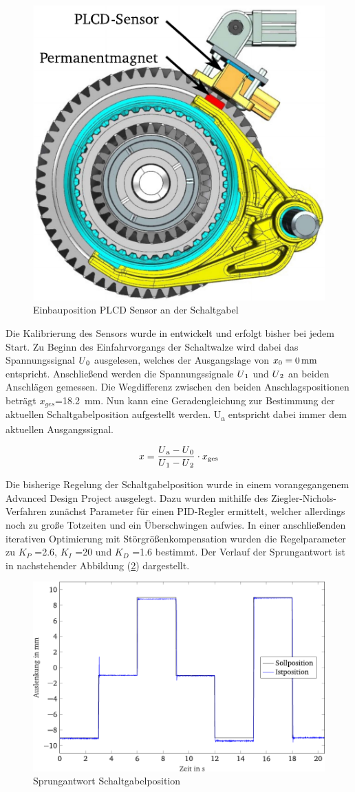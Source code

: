 \begin{figure}[h]
	\centering
		\includegraphics[width=0.35\columnwidth]{Bilder/Sensor.pdf}
	\caption{Einbauposition PLCD Sensor an der Schaltgabel \cite[S.14]{adp}}
	\label{fig:Sensor}
\end{figure} \noindent
Die Kalibrierung des Sensors wurde in \cite[S.24f]{messtechnik} entwickelt und erfolgt bisher bei jedem Start. Zu Beginn des Einfahrvorgangs der Schaltwalze wird dabei das Spannungssignal $U\textsubscript{0}$ ausgelesen, welches der Ausgangslage von $x\textsubscript{0}=\SI{0}{mm}$ entspricht. Anschließend werden die Spannungssignale $U\textsubscript{1}$ und $U\textsubscript{2}$ an beiden Anschlägen gemessen. Die Wegdifferenz zwischen den beiden Anschlagspositionen beträgt $x_{ges}$=\SI{18,2}{mm}. Nun kann eine Geradengleichung zur Bestimmung der aktuellen Schaltgabelposition aufgestellt werden. U\textsubscript{a} entspricht dabei immer dem aktuellen Ausgangssignal.

\begin{equation}\label{eq:Lage}
	x=\frac{U\textsubscript{a} -U\textsubscript{0}}{U\textsubscript{1}-U\textsubscript{2}}\cdot x\textsubscript{ges}
\end{equation}

Die bisherige Regelung der Schaltgabelposition wurde in einem vorangegangenem Advanced Design Project ausgelegt. Dazu wurden mithilfe des Ziegler-Nichols-Verfahren zunächst Parameter für einen PID-Regler ermittelt, welcher allerdings noch zu große Totzeiten und ein Überschwingen aufwies. In einer anschließenden iterativen Optimierung mit Störgrößenkompensation wurden die Regelparameter zu $K_P$ =\SI{2,6}{}, $K_I$ =\SI{20}{} und $K_D$ =\SI{1,6}{} bestimmt. Der Verlauf der Sprungantwort ist in nachstehender Abbildung (\ref{fig:Sprungantwort Schaltgabelposition}) dargestellt.
\begin{figure}[h]
	\centering
		\includegraphics[width=0.6\columnwidth]{Bilder/SprungantwortSchaltgabelposition.pdf}
	\caption{Sprungantwort Schaltgabelposition \cite[S.35]{adp}}
	\label{fig:Sprungantwort Schaltgabelposition}
\end{figure} \noindent

